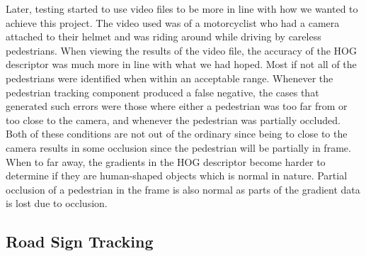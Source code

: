 Later, testing started to use video files to be more in line with how we wanted to achieve this project. The video used was of a motorcyclist who had a camera attached to their helmet and was riding around while driving by careless pedestrians. When viewing the results of the video file, the accuracy of the HOG descriptor was much more in line with what we had hoped. Most if not all of the pedestrians were identified when within an acceptable range. Whenever the pedestrian tracking component produced a false negative, the cases that generated such errors were those where either a pedestrian was too far from or too close to the camera, and whenever the pedestrian was partially occluded. Both of these conditions are not out of the ordinary since being to close to the camera results in some occlusion since the pedestrian will be partially in frame. When to far away, the gradients in the HOG descriptor become harder to determine if they are human-shaped objects which is normal in nature. Partial occlusion of a pedestrian in the frame is also normal as parts of the gradient data is lost due to occlusion.

\subsection{Road Sign Tracking}